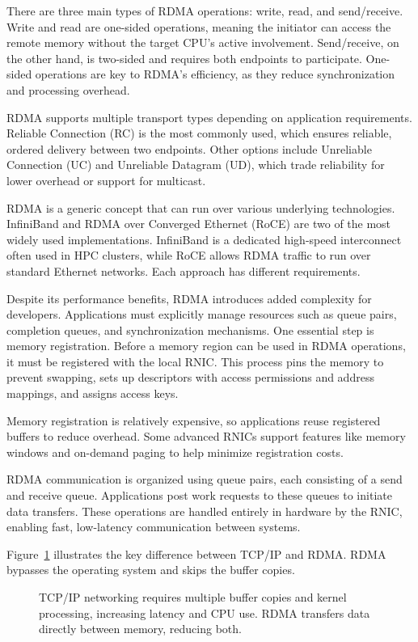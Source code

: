 There are three main types of RDMA operations: write, read, and send/receive. Write and read are one-sided operations, meaning the initiator can access the remote memory without the target CPU’s active involvement. Send/receive, on the other hand, is two-sided and requires both endpoints to participate. One-sided operations are key to RDMA’s efficiency, as they reduce synchronization and processing overhead.

RDMA supports multiple transport types depending on application requirements. Reliable Connection (RC) is the most commonly used, which ensures reliable, ordered delivery between two endpoints. Other options include Unreliable Connection (UC) and Unreliable Datagram (UD), which trade reliability for lower overhead or support for multicast.

RDMA is a generic concept that can run over various underlying technologies. InfiniBand and RDMA over Converged Ethernet (RoCE) are two of the most widely used implementations. InfiniBand is a dedicated high-speed interconnect often used in HPC clusters, while RoCE allows RDMA traffic to run over standard Ethernet networks. Each approach has different requirements.

Despite its performance benefits, RDMA introduces added complexity for developers. Applications must explicitly manage resources such as queue pairs, completion queues, and synchronization mechanisms. One essential step is memory registration. Before a memory region can be used in RDMA operations, it must be registered with the local RNIC. This process pins the memory to prevent swapping, sets up descriptors with access permissions and address mappings, and assigns access keys.

Memory registration is relatively expensive, so applications reuse registered buffers to reduce overhead. Some advanced RNICs support features like memory windows and on-demand paging to help minimize registration costs.

RDMA communication is organized using queue pairs, each consisting of a send and receive queue. Applications post work requests to these queues to initiate data transfers. These operations are handled entirely in hardware by the RNIC, enabling fast, low-latency communication between systems.

Figure~\ref{fig:rdma} illustrates the key difference between TCP/IP and RDMA. RDMA bypasses the operating system and skips the buffer copies.

\begin{figure}[H]
    \centering
    
    \caption[RDMA vs TCP]{TCP/IP networking requires multiple buffer copies and kernel processing, increasing latency and CPU use. RDMA transfers data directly between memory, reducing both.}
    \label{fig:rdma}
\end{figure}


